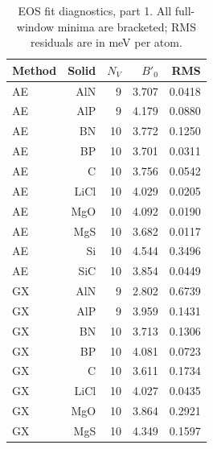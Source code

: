 \begin{table}[t]
\centering
\small
\caption{EOS fit diagnostics, part 1. All full-window minima are bracketed; RMS residuals are in meV per atom.}
\label{tab:eos-fit-1}
\begin{tabular}{lrrrr}
\toprule
Method & Solid & $N_V$ & $B'_0$ & RMS \\
\midrule
AE & AlN & 9 & 3.707 & 0.0418 \\
AE & AlP & 9 & 4.179 & 0.0880 \\
AE & BN & 10 & 3.772 & 0.1250 \\
AE & BP & 10 & 3.701 & 0.0311 \\
AE & C & 10 & 3.756 & 0.0542 \\
AE & LiCl & 10 & 4.029 & 0.0205 \\
AE & MgO & 10 & 4.092 & 0.0190 \\
AE & MgS & 10 & 3.682 & 0.0117 \\
AE & Si & 10 & 4.544 & 0.3496 \\
AE & SiC & 10 & 3.854 & 0.0449 \\
GX & AlN & 9 & 2.802 & 0.6739 \\
GX & AlP & 9 & 3.959 & 0.1431 \\
GX & BN & 10 & 3.713 & 0.1306 \\
GX & BP & 10 & 4.081 & 0.0723 \\
GX & C & 10 & 3.611 & 0.1734 \\
GX & LiCl & 10 & 4.027 & 0.0435 \\
GX & MgO & 10 & 3.864 & 0.2921 \\
GX & MgS & 10 & 4.349 & 0.1597 \\
\bottomrule
\end{tabular}
\end{table}

